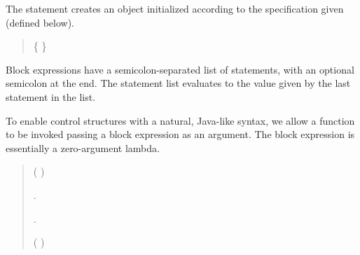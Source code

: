 \begin{quote}


 {}

 {} 

 {}

\end{quote}

The  statement creates an object initialized according to the
 specification given (defined below).

\begin{quote}


 \{  \}


 {}  \opt{;}

\end{quote}

Block expressions have a semicolon-separated list of statements, with
an optional semicolon at the end.  The statement list evaluates to the
value given by the last statement in the list.

\begin{quote}


 {}

 {} 

\end{quote}

To enable control structures with a natural, Java-like syntax, we allow
a function to be invoked passing a block expression as an argument.  The
block expression is essentially a zero-argument lambda.

\begin{quote}


 {}

 {}

 {}

 (  ) 

 {} . 

 {} . 

 {}   


 {} 




 (   ) 

\end{quote}

